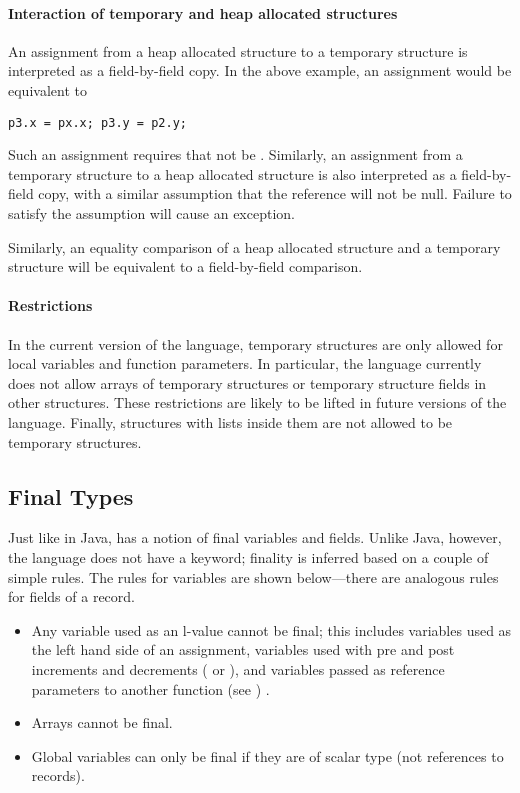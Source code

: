 \paragraph{Interaction of temporary and heap allocated structures}
An assignment from a heap allocated structure to a temporary structure is interpreted as a field-by-field copy. In the above example, an assignment  would be equivalent to 
\begin{lstlisting}
p3.x = px.x; p3.y = p2.y;
\end{lstlisting}
Such an assignment requires that  not be . Similarly, an assignment from a temporary structure to a heap allocated structure is also interpreted as a field-by-field copy, with a similar assumption that the reference will not be null. Failure to satisfy the assumption will cause an exception. 

Similarly, an equality comparison of a heap allocated structure and a temporary structure will be equivalent to a field-by-field comparison.

\paragraph{Restrictions}
In the current version of the language, temporary structures are only allowed for local variables and function parameters. In particular, the language currently does not allow arrays of temporary structures or temporary structure fields in other structures. These restrictions are likely to be lifted in future versions of the language. Finally, structures with lists inside them are not allowed to be temporary structures.




\subsection{Final Types}
Just like in Java, \Sk{} has a notion of final variables and fields. Unlike Java, however, the language does not have a  keyword; finality is inferred based on a couple of simple rules. The rules for variables are shown below---there are analogous rules for fields of a record. 

\begin{itemize}
\item Any variable used as an l-value cannot be final; this includes variables used as the left hand side of an assignment, variables used with pre and post increments and decrements ( or ), and variables passed as reference parameters to another function (see ) .
\item Arrays cannot be final. 
\item Global variables can only be final if they are of scalar type (not references to records).
\end{itemize}


